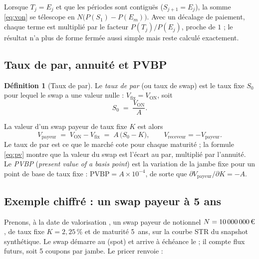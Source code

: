 \documentclass[11pt,a4paper]{article}
\newcommand{\estr}{\texorpdfstring{\texteuro STR}{EUR STR}}
\newcommand{\pct}[1]{#1\,\%}
\newcommand{\eur}{\ifmmode\,\text{\texteuro}\else\,\texteuro\fi}
\newcommand{\DF}[1]{P(#1)}
\theoremstyle{plain}
\theoremstyle{definition}
\newtheorem{definition}{Définition}
\theoremstyle{remark}
\begin{document}
Lorsque $T_j=E_j$ et que les périodes sont contiguës ($S_{j+1}=E_j$), la somme \eqref{eq:von} se
télescope en $N\bigl(\DF{S_1}-\DF{E_m}\bigr)$. Avec un décalage de paiement, chaque terme est
multiplié par le facteur $\DF{T_j}/\DF{E_j}$, proche de $1$ ; le résultat n'a plus de forme fermée
aussi simple mais reste calculé exactement.

\subsection{Taux de par, annuité et PVBP}

\begin{definition}[Taux de par]
Le \emph{taux de par} (ou taux de swap) est le taux fixe $S_0$ pour lequel le swap a une valeur
nulle : $V_{\mathrm{fix}}=V_{\mathrm{ON}}$, soit
\begin{equation}
  S_0 \;=\; \frac{V_{\mathrm{ON}}}{A}.
  \label{eq:par}
\end{equation}
\end{definition}

La valeur d'un swap payeur de taux fixe $K$ est alors
\begin{equation}
  V_{\mathrm{payeur}} \;=\; V_{\mathrm{ON}}-V_{\mathrm{fix}} \;=\; A\,\bigl(S_0-K\bigr),
  \qquad V_{\mathrm{receveur}}=-V_{\mathrm{payeur}}.
  \label{eq:pv}
\end{equation}
Le taux de par est ce que le marché cote pour chaque maturité ; la formule \eqref{eq:pv} montre que
la valeur du swap est l'écart au par, multiplié par l'annuité. Le \emph{PVBP} (\emph{present value of
a basis point}) est la variation de la jambe fixe pour un point de base de taux fixe :
$\mathrm{PVBP}=A\times10^{-4}$, de sorte que $\partial V_{\mathrm{payeur}}/\partial K=-A$.

\subsection{Exemple chiffré : un swap payeur à 5 ans}\label{sec:exemple}

Prenons, à la date de valorisation \ValuationDate{}, un swap payeur de notionnel
$N=10\,000\,000\eur$, de taux fixe $K=\pct{2{,}25}$ et de maturité 5~ans, sur la courbe
\estr{} du snapshot synthétique. Le swap démarre au \FiveYStart{} (spot) et arrive à échéance le
\FiveYEnd{} ; il compte \FiveYCashflowCount{} flux futurs, soit 5 coupons par jambe. Le pricer
renvoie :
\end{document}
